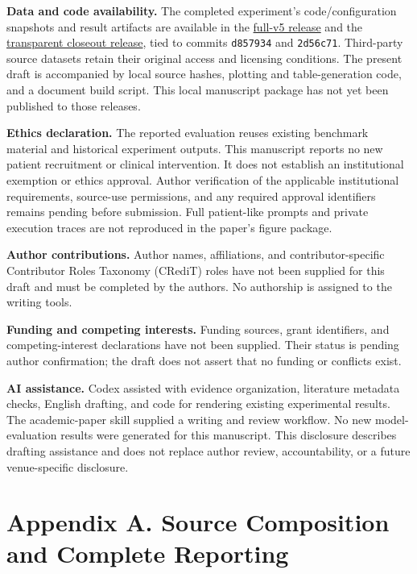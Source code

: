 \documentclass[
  english,
  11pt,
]{article}
\begin{document}
\textbf{Data and code availability.} The completed experiment's
code/configuration snapshots and result artifacts are available in the
\href{https://github.com/xiotakut/cf_mrg/tree/main/benchmarks/2026-09-26_cf_moa_rcv_full_v5}{full-v5
release} and the
\href{https://github.com/xiotakut/cf_mrg/tree/main/benchmarks/2026-09-28_cf_moa_transparent_closeout}{transparent
closeout release}, tied to commits \texttt{d857934} and
\texttt{2d56c71}. Third-party source datasets retain their original
access and licensing conditions. The present draft is accompanied by
local source hashes, plotting and table-generation code, and a document
build script. This local manuscript package has not yet been published
to those releases.

\textbf{Ethics declaration.} The reported evaluation reuses existing
benchmark material and historical experiment outputs. This manuscript
reports no new patient recruitment or clinical intervention. It does not
establish an institutional exemption or ethics approval. Author
verification of the applicable institutional requirements, source-use
permissions, and any required approval identifiers remains pending
before submission. Full patient-like prompts and private execution
traces are not reproduced in the paper's figure package.

\textbf{Author contributions.} Author names, affiliations, and
contributor-specific Contributor Roles Taxonomy (CRediT) roles have not
been supplied for this draft and must be completed by the authors. No
authorship is assigned to the writing tools.

\textbf{Funding and competing interests.} Funding sources, grant
identifiers, and competing-interest declarations have not been supplied.
Their status is pending author confirmation; the draft does not assert
that no funding or conflicts exist.

\textbf{AI assistance.} Codex assisted with evidence organization,
literature metadata checks, English drafting, and code for rendering
existing experimental results. The academic-paper skill supplied a
writing and review workflow. No new model-evaluation results were
generated for this manuscript. This disclosure describes drafting
assistance and does not replace author review, accountability, or a
future venue-specific disclosure.

\section*{Appendix A. Source Composition and Complete
Reporting}\label{appendix-a.-source-composition-and-complete-reporting}
\end{document}
